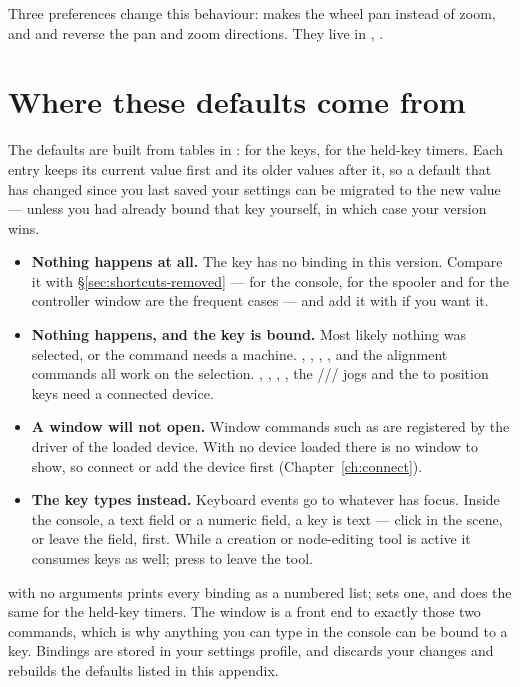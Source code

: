 \noindent Three preferences change this behaviour: 
makes the wheel pan instead of zoom, and  and
 reverse the pan and zoom directions. They live in
, .

\section{Where these defaults come from}

The defaults are built from tables in :
 for the keys,  for the held-key timers.
Each entry keeps its current value first and its older values after it, so a
default that has changed since you last saved your settings can be migrated to
the new value --- unless you had already bound that key yourself, in which case
your version wins.

\begin{itemize}
  \item \textbf{Nothing happens at all.} The key has no binding in this version.
        Compare it with \S\ref{sec:shortcuts-removed} ---  for the
        console,  for the spooler and  for the controller window
        are the frequent cases --- and add it with  if you want
        it.
  \item \textbf{Nothing happens, and the key is bound.} Most likely nothing was
        selected, or the command needs a machine. , ,
        , ,  and the alignment
        commands all work on the selection. , ,
        , , the /// jogs and
        the  to  position keys need a connected
        device.
  \item \textbf{A window will not open.} Window commands such as
         are registered by the driver of the loaded
        device. With no device loaded there is no window to show, so connect or
        add the device first (Chapter~\ref{ch:connect}).
  \item \textbf{The key types instead.} Keyboard events go to whatever has
        focus. Inside the console, a text field or a numeric field, a key is
        text --- click in the scene, or leave the field, first. While a creation
        or node-editing tool is active it consumes keys as well; press
         to leave the tool.
\end{itemize}

\begin{behindbox}
 with no arguments prints every binding as a numbered list;
 sets one, and  does the same for the
held-key timers. The  window is a front end to exactly those two
commands, which is why anything you can type in the console can be bound to a
key. Bindings are stored in your settings profile, and
 discards your changes and rebuilds the defaults
listed in this appendix.
\end{behindbox}

